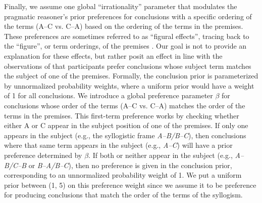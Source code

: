 \documentclass[floatsintext, doc]{apa6}
\begin{document}

Finally, we assume one global ``irrationality'' parameter that modulates the pragmatic reasoner's prior preferences for conclusions with a specific ordering of the terms (A--C vs. C--A) based on the ordering of the terms in the premises. 
These preferences are sometimes referred to as ``figural effects'', tracing back to the ``figure'', or term orderings, of the premises \cite{Wetherick1990, rips1994}.
Our goal is not to provide an explanation for these effects, but rather posit an effect in line with the observations of  that participants prefer conclusions whose subject term matches the subject of one of the premises.
Formally, the conclusion prior is parameterized by unnormalized probability weights, where a uniform prior would have a weight of 1 for all conclusions. 
We introduce a global preference  parameter $\beta$ for conclusions whose order of the terms (A--C vs. C--A) matches the order of the terms in the premises.
This first-term preference works by checking whether either A or C appear in the subject position of one of the premises.
If only one appears in the subject (e.g., the syllogistic frame \emph{A--B/B--C}), then conclusions where that same term appears in the subject (e.g., \emph{A--C}) will have a prior preference determined by $\beta$.
If both or neither appear in the subject (e.g., \emph{A--B/C--B} or \emph{B--A/B--C}), then no preference is given in the conclusion prior, corresponding to an unnormalized probability weight of 1. 
We put a uniform prior between (1, 5) on this preference weight since we assume it to be preference for producing conclusions that match the order of the terms of the syllogism. 





\end{document}
